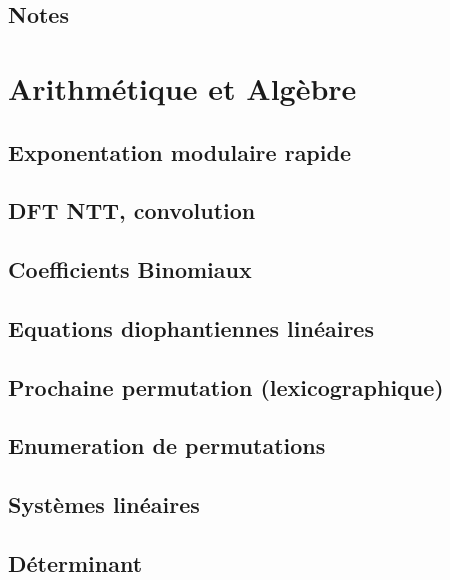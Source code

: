 \documentclass[12pt]{article}
\begin{document}
\subsection{Notes}



\section{Arithmétique et Algèbre}
\subsection{Exponentation modulaire rapide}
{\scriptsize}

\subsection{DFT NTT, convolution}
{\scriptsize}

\subsection{Coefficients Binomiaux}
{\scriptsize}

\subsection{Equations diophantiennes linéaires}
{\scriptsize}

\subsection{Prochaine permutation (lexicographique)}
{\scriptsize}

\subsection{Enumeration de permutations}
{\scriptsize}

\subsection{Systèmes linéaires}
{\scriptsize}

\subsection{Déterminant}
{\scriptsize}
\end{document}
